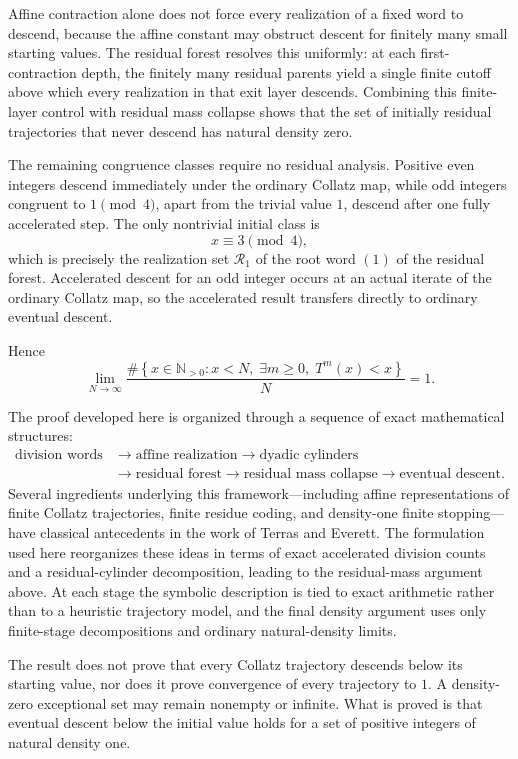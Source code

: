 \documentclass[12pt, oneside]{article}
\numberwithin{equation}{section}
\theoremstyle{definition}
\theoremstyle{plain}
\theoremstyle{remark}
\begin{document}
Affine contraction alone does not force every realization of a fixed word
to descend, because the affine constant may obstruct descent for finitely
many small starting values. The residual forest resolves this uniformly:
at each first-contraction depth, the finitely many residual parents yield a
single finite cutoff above which every realization in that exit layer
descends. Combining this finite-layer control with residual mass collapse
shows that the set of initially residual trajectories that never descend has
natural density zero.

The remaining congruence classes require no residual analysis. Positive even
integers descend immediately under the ordinary Collatz map, while odd
integers congruent to \(1\pmod4\), apart from the trivial value \(1\),
descend after one fully accelerated step. The only nontrivial initial class
is
\[
x\equiv3\pmod4,
\]
which is precisely the realization set \(\mathcal R_1\) of the root word
\((1)\) of the residual forest. Accelerated descent for an odd integer
occurs at an actual iterate of the ordinary Collatz map, so the accelerated
result transfers directly to ordinary eventual descent.

Hence
\[
\boxed{
\lim_{N\to\infty}
\frac{
\#\left\{
x\in\mathbb N_{>0}:
x<N,\;
\exists m\ge0,\;
T^m(x)<x
\right\}
}{N}
=
1.
}
\]

The proof developed here is organized through a sequence of exact
mathematical structures:
\[
\boxed{
\begin{aligned}
\text{division words}
&\longrightarrow
\text{affine realization}
\longrightarrow
\text{dyadic cylinders}
\\
&\longrightarrow
\text{residual forest}
\longrightarrow
\text{residual mass collapse}
\longrightarrow
\text{eventual descent}.
\end{aligned}
}
\]
Several ingredients underlying this framework---including affine
representations of finite Collatz trajectories, finite residue coding, and
density-one finite stopping---have classical antecedents in the work of
Terras and Everett. The formulation used here reorganizes these ideas in
terms of exact accelerated division counts and a residual-cylinder
decomposition, leading to the residual-mass argument above. At each stage
the symbolic description is tied to exact arithmetic rather than to a
heuristic trajectory model, and the final density argument uses only
finite-stage decompositions and ordinary natural-density limits.

The result does not prove that every Collatz trajectory descends below its
starting value, nor does it prove convergence of every trajectory to \(1\).
A density-zero exceptional set may remain nonempty or infinite. What is
proved is that eventual descent below the initial value holds for a set of
positive integers of natural density one.
\end{document}
